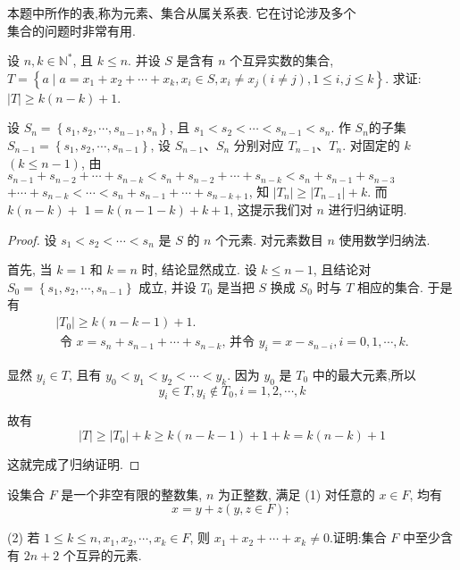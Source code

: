 \begin{note}
	本题中所作的表,称为元素、集合从属关系表. 它在讨论涉及多个\\
	集合的问题时非常有用.
\end{note}

\begin{example}
	设 $n, k \in \mathbb{N}^{*}$, 且 $k \leqslant n$. 并设 $S$ 是含有 $n$ 个互异实数的集合, $T=\left\{a \mid a=x_{1}+x_{2}+\cdots+x_{k}, x_{i} \in S, x_{i} \neq x_{j}(i \neq j), 1 \leqslant i, j \leqslant k\right\}$. 求证: $|T| \geqslant k(n-k)+1$.
\end{example}

\begin{analysis}
	设 $S_{n}=\left\{s_{1}, s_{2}, \cdots, s_{n-1}, s_{n}\right\}$, 且 $s_{1}<s_{2}<\cdots<s_{n-1}<s_{n}$. 作 $S_{n}$的子集 $S_{n-1}=\left\{s_{1}, s_{2}, \cdots, s_{n-1}\right\}$, 设 $S_{n-1} 、 S_{n}$ 分别对应 $T_{n-1} 、 T_{n}$. 对固定的 $k$ $(k \leqslant n-1)$, 由 $s_{n-1}+s_{n-2}+\cdots+s_{n-k}<s_{n}+s_{n-2}+\cdots+s_{n-k}<s_{n}+s_{n-1}+s_{n-3}$ $+\cdots+s_{n-k}<\cdots<s_{n}+s_{n-1}+\cdots+s_{n-k+1}$, 知 $\left|T_{n}\right| \geqslant\left|T_{n-1}\right|+k$. 而 $k(n-k)+$ $1=k(n-1-k)+k+1$, 这提示我们对 $n$ 进行归纳证明.
\end{analysis}

\begin{proof}
	设 $s_{1}<s_{2}<\cdots<s_{n}$ 是 $S$ 的 $n$ 个元素. 对元素数目 $n$ 使用数学归纳法.

	首先, 当 $k=1$ 和 $k=n$ 时, 结论显然成立. 设 $k \leqslant n-1$, 且结论对 $S_{0}=\left\{s_{1}, s_{2}, \cdots, s_{n-1}\right\}$ 成立, 并设 $T_{0}$ 是当把 $S$ 换成 $S_{0}$ 时与 $T$ 相应的集合. 于是有
	$$
		\begin{gathered}
			\left|T_{0}\right| \geqslant k(n-k-1)+1 . \\
			\text { 令 } x=s_{n}+s_{n-1}+\cdots+s_{n-k} \text {, 并令 } y_{i}=x-s_{n-i}, i=0,1, \cdots, k .
		\end{gathered}
	$$

	显然 $y_{i} \in T$, 且有 $y_{0}<y_{1}<y_{2}<\cdots<y_{k}$. 因为 $y_{0}$ 是 $T_{0}$ 中的最大元素,所以
	$$
		y_{i} \in T, y_{i} \notin T_{0}, i=1,2, \cdots, k
	$$

	故有
	$$
		|T| \geqslant\left|T_{0}\right|+k \geqslant k(n-k-1)+1+k=k(n-k)+1
	$$

	这就完成了归纳证明.
\end{proof}

\begin{example}
	设集合 $F$ 是一个非空有限的整数集, $n$ 为正整数, 满足 (1) 对任意的 $x \in F$, 均有
	$$
		x=y+z(y, z \in F) \text {; }
	$$

	(2) 若 $1 \leqslant k \leqslant n, x_{1}, x_{2}, \cdots, x_{k} \in F$, 则 $x_{1}+x_{2}+\cdots+x_{k} \neq 0$.证明:集合 $F$ 中至少含有 $2 n+2$ 个互异的元素.
\end{example}

